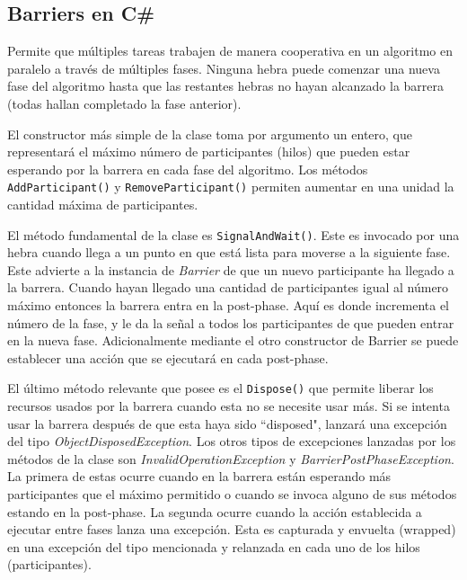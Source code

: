 \documentclass[10pt]{article} %
\newcommand{\csl}[1]{\colorbox{backcolour}{\texttt{#1}}}
\begin{document}
\subsection{Barriers en C\#}

Permite que múltiples tareas trabajen de manera cooperativa en un algoritmo en paralelo a través de múltiples fases. Ninguna hebra puede comenzar una nueva fase del algoritmo hasta que las restantes hebras no hayan alcanzado la barrera (todas hallan completado la fase anterior).

El constructor m\'as simple de la clase toma por argumento un entero, que representar\'a el m\'aximo n\'umero de participantes (hilos) que pueden estar esperando por la barrera en cada fase del algoritmo. Los m\'etodos \csl{AddParticipant()} y \csl{RemoveParticipant()} permiten aumentar en una unidad la cantidad m\'axima de participantes. 

El m\'etodo fundamental de la clase es \csl{SignalAndWait()}. Este es invocado por una hebra cuando llega a un punto en que est\'a lista para moverse a la siguiente fase. Este advierte a la instancia de \emph{Barrier} de que un nuevo participante ha llegado a la barrera. Cuando hayan llegado una cantidad de participantes igual al n\'umero m\'aximo entonces la barrera entra en la post-phase. Aqu\'i es donde incrementa el n\'umero de la fase, y le da la se\~nal a todos los participantes de que pueden entrar en la nueva fase. Adicionalmente mediante el otro constructor de Barrier se puede establecer una acci\'on que se ejecutar\'a en cada post-phase. 

El \'ultimo m\'etodo relevante que posee es el \csl{Dispose()} que permite liberar los recursos usados por la barrera cuando esta no se necesite usar m\'as. Si se intenta usar la barrera despu\'es de que esta haya sido ``disposed", lanzar\'a una excepci\'on del tipo \emph{ObjectDisposedException}. Los otros tipos de excepciones lanzadas por los m\'etodos de la clase son \emph{InvalidOperationException} y \emph{BarrierPostPhaseException}. La primera de estas ocurre cuando en la barrera est\'an esperando m\'as participantes que el m\'aximo permitido o cuando se invoca alguno de sus m\'etodos estando en la post-phase. La segunda ocurre cuando la acci\'on establecida a ejecutar entre fases lanza una excepci\'on. Esta es capturada y envuelta (wrapped) en una excepci\'on del tipo mencionada y relanzada en cada uno de los hilos (participantes).
\end{document}
